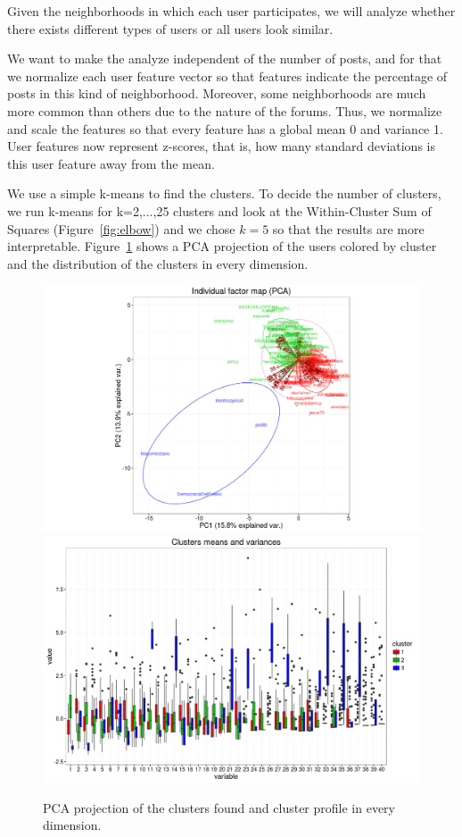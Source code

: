 \documentclass[9pt,technote]{IEEEtran}
\begin{document}
Given the neighborhoods in which each user participates, we will analyze whether there exists different types of users or all users look similar.

We want to make the analyze independent of the number of posts, and for that we normalize each user feature vector so that features indicate the percentage of posts in this kind of neighborhood. Moreover, some neighborhoods are much more common than others due to the nature of the forums. Thus, we normalize and scale the features so that every feature has a global mean 0 and variance 1. User features now represent z-scores, that is, how many standard deviations is this user feature away from the mean.

We use a simple k-means to find the clusters. To decide the number of clusters, we run k-means for k=2,...,25 clusters and look at the Within-Cluster Sum of Squares (Figure~\ref{fig:elbow}) and we chose $k=5$ so that the results are more interpretable.  Figure~\ref{fig:PCA} shows a PCA projection of the users colored by cluster and the distribution of the clusters in every dimension.



\begin{figure}
	\centering
	\includegraphics[width=1\textwidth]{PCA_clustering_3_4_order}
	\includegraphics[width=1\textwidth]{clustering_3_4_order}
	\caption{PCA projection of the clusters found and cluster profile in every dimension.}
	\label{fig:PCA}
\end{figure}
\end{document}
